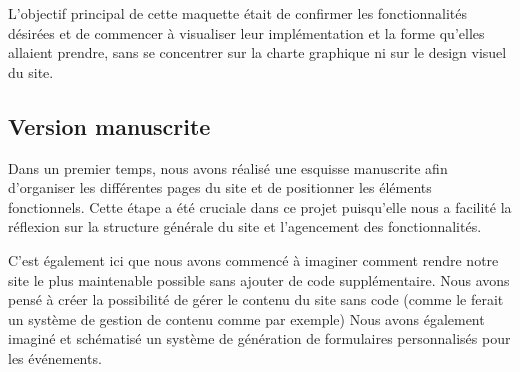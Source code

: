 L'objectif principal de cette maquette était de confirmer les fonctionnalités désirées et de commencer à visualiser leur implémentation et la forme qu'elles allaient prendre, sans se concentrer sur la charte graphique ni sur le design visuel du site.

\subsection{Version manuscrite}
\label{subsec:maquette-manuscrite}

Dans un premier temps, nous avons réalisé une esquisse manuscrite afin d’organiser les différentes pages du site et de positionner les éléments fonctionnels. Cette étape a été cruciale dans ce projet puisqu'elle nous a facilité la réflexion sur la structure générale du site et l'agencement des fonctionnalités.

C'est également ici que nous avons commencé à imaginer comment rendre notre site le plus maintenable possible sans ajouter de code supplémentaire. Nous avons pensé à créer la possibilité de gérer le contenu du site sans code (comme le ferait un système de gestion de contenu comme  par exemple)
Nous avons également imaginé et schématisé un système de génération de formulaires personnalisés pour les événements.


